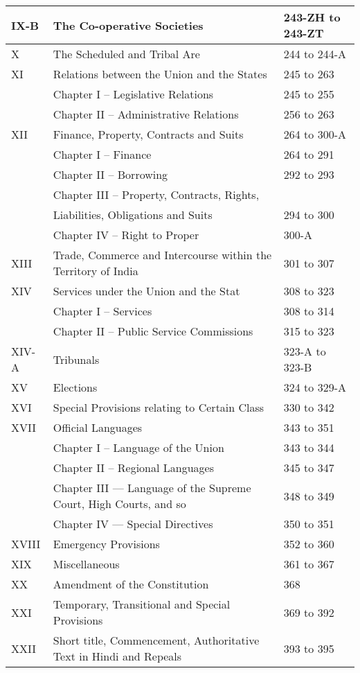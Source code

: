 \begin{longtable}[c]{@{}|p{1.2cm}|p{7cm}|p{3.8cm}|@{}}
  IX-B & The Co-operative Societies & 243-ZH to 243-ZT \\\midrule
  X & The Scheduled and Tribal Are & 244 to 244-A \\\midrule
  XI & Relations between the Union and the States & 245 to 263 \\
  & Chapter I – Legislative Relations & 245 to 255 \\
  & Chapter II – Administrative Relations & 256 to 263 \\\midrule
  XII & Finance, Property, Contracts and Suits & 264 to 300-A \\*\midrule
  & Chapter I – Finance & 264 to 291 \\
  & Chapter II – Borrowing & 292 to 293 \\
  & Chapter III – Property, Contracts, Rights, &  \\
  & Liabilities, Obligations and Suits & 294 to 300 \\
  & Chapter IV – Right to Proper & 300-A \\ \midrule
  XIII & Trade, Commerce and Intercourse within the Territory of India & 301 to 307 \\\midrule
  XIV & Services under the Union and the Stat & 308 to 323 \\
  & Chapter I – Services & 308 to 314 \\
  & Chapter II – Public Service Commissions & 315 to 323 \\\midrule
  XIV-A & Tribunals & 323-A to 323-B \\\midrule
  XV & Elections & 324 to 329-A \\\midrule
  XVI & Special Provisions relating to Certain Class & 330 to 342 \\\midrule
  XVII & Official Languages & 343 to 351 \\
  & Chapter I – Language of the Union & 343 to 344 \\
  & Chapter II – Regional Languages & 345 to 347 \\
  & Chapter III — Language of the Supreme Court, High Courts, and so & 348 to 349 \\
  & Chapter IV — Special Directives & 350 to 351 \\\midrule
  XVIII & Emergency Provisions & 352 to 360 \\\midrule
  XIX & Miscellaneous & 361 to 367 \\\midrule
  XX & Amendment of the Constitution & 368 \\\midrule
  XXI & Temporary, Transitional and Special Provisions & 369 to 392 \\\midrule
  XXII & Short title, Commencement, Authoritative Text in Hindi and Repeals & 393 to 395\\\bottomrule
\end{longtable}

